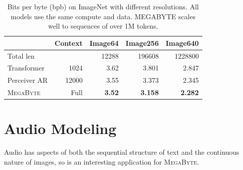\documentclass{article}
\newcommand{\fastslow}[0]{\textsc{MegaByte}\xspace}
\newcommand{\megabyte}[0]{\fastslow}
\newcommand{\bpb}[0]{bpb\xspace}
\theoremstyle{plain}
\theoremstyle{definition}
\theoremstyle{remark}
\begin{document}
\begin{table}[t]
\centering
\small
\begin{tabular}{lrrrr}
\toprule
{} & Context & Image64 & Image256 & Image640 \\
\midrule
Total len & & 12288 & 196608 & 1228800 \\
\midrule
Transformer & 1024 & 3.62 & 3.801 & 2.847 \\
Perceiver AR & 12000 & 3.55 & 3.373 & 2.345 \\
\midrule
\megabyte & Full & \textbf{3.52} & \textbf{3.158} & \textbf{2.282} \\
\bottomrule
\end{tabular}
\caption{Bits per byte (\bpb) on ImageNet with different resolutions. All models use the same compute and data. MEGABYTE scales well to sequences of over 1M tokens.
\label{tab:resolution_scale}}
\end{table}


\section{Audio Modeling}
\label{sec:speech}


Audio has aspects of both the sequential structure of text and the continuous nature of images, so is an interesting application for \megabyte.

\end{document}
